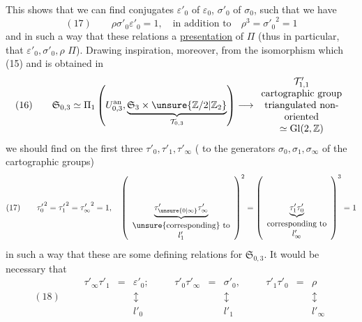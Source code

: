 

This shows that we can find
conjugates $\varepsilon'_0$ of $\varepsilon_0$, $\sigma'_0$ of $\sigma_0$,
such that we have
\[
(17)\qquad
\rho\sigma'_0\varepsilon'_0=1,\quad
\text{in addition to}\quad \rho^3={\sigma'_0}^{2}=1
\]
and in such a way that these relations 
a \uline{presentation} of $\Pi$ (thus in particular,
that $\varepsilon'_0,\sigma'_0,\rho$  \unsure{$\}$} $\Pi$).
Drawing inspiration, moreover, from the isomorphism  which
 (15) and is obtained in 
\[
(16)\qquad
\mathfrak{S}_{0,3}
\simeq\Pi_1\left(U_{0,3}^{\mathrm{an}},
\underbrace{\mathfrak{S}_3\times\unsure{\mathbb{Z}/2|\mathbb{Z}_2}}_{\mathcal{T}_{0,3}}\right)
\longrightarrow
\begin{array}{c}
\mathcal{T}'_{1,1}\\
\text{cartographic group}\\
\text{triangulated non-}\\
\text{oriented}\\
\simeq\mathrm{Gl}(2,\mathbb{Z})
\end{array}
\]
we should find on the first 
three  $\tau'_0,\tau'_1,\tau'_\infty$
( to the  generators
$\sigma_0,\sigma_1,\sigma_\infty$ of the
 cartographic groups) 
\[
(17)\qquad
{\tau'_0}^{2}={\tau'_1}^{2}={\tau'_\infty}^{2}=1,\quad
\left(\underbrace{\tau'_{\unsure{0|\infty}}\tau'_\infty}_{\begin{array}{c}\text{\unsure{corresponding} to}\\l'_1\end{array}}\right)^2
=\left(\underbrace{\tau'_1\tau'_0}_{\begin{array}{c}\text{corresponding to}\\l'_\infty\end{array}}\right)^3=1
\]
in such a way that these are  some
defining relations for $\mathfrak{S}_{0,3}$.
It would be necessary that
\[
(18)\qquad
\begin{array}{rclcrclcrcl}
\tau'_\infty\tau'_1&=&\varepsilon'_0;&\quad&
\tau'_0\tau'_\infty&=&\sigma'_0,&\quad&
\tau'_1\tau'_0&=&\rho\\
&&\updownarrow&&&&\updownarrow&&&&\updownarrow\\
&&l'_0&&&&l'_1&&&&l'_\infty
\end{array}
\]
